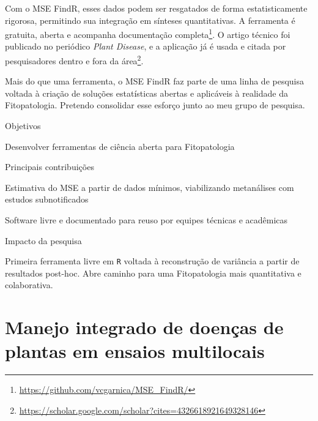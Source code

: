 \documentclass[12pt,a4paper,oneside]{book}
\begin{document}
Com o MSE FindR, esses dados podem ser resgatados de forma estatisticamente rigorosa, 
permitindo sua integração em sínteses quantitativas. A ferramenta é gratuita, aberta e 
acompanha documentação completa\footnote{\url{https://github.com/vcgarnica/MSE_FindR/}}. O artigo 
técnico foi publicado no periódico \emph{Plant Disease}, e a aplicação já é usada e citada por pesquisadores dentro e fora 
da área\footnote{\url{https://scholar.google.com/scholar?cites=4326618921649328146}}.

Mais do que uma ferramenta, o MSE FindR faz parte de uma linha de pesquisa voltada à
criação de soluções estatísticas abertas e aplicáveis à realidade da Fitopatologia. Pretendo consolidar 
esse esforço junto ao meu grupo de pesquisa.

\begin{fancyenum}{\faBullseye}{Objetivos}
  \item Desenvolver ferramentas de ciência aberta para Fitopatologia
\end{fancyenum}

\begin{fancyenum}{\faLightbulb}{Principais contribuições}
  \item Estimativa do MSE a partir de dados mínimos, viabilizando metanálises com estudos subnotificados
  \item Software livre e documentado para reuso por equipes técnicas e acadêmicas
\end{fancyenum}

\begin{fancyenum}{\faRocket}{Impacto da pesquisa}
  \item Primeira ferramenta livre em \texttt{R} voltada à reconstrução de variância a partir de resultados post-hoc.
  Abre caminho para uma Fitopatologia mais quantitativa e colaborativa.
\end{fancyenum}



\section{Manejo integrado de doenças de plantas em ensaios multilocais}
\label{sec_met}
\end{document}
